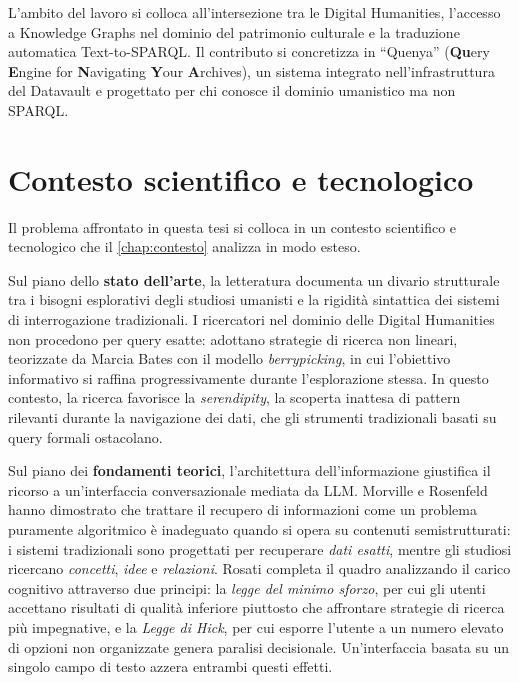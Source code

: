 L'ambito del lavoro si colloca all'intersezione tra le Digital Humanities, l'accesso a Knowledge Graphs nel dominio del patrimonio culturale e la traduzione automatica Text-to-SPARQL\@. Il contributo si concretizza in ``Quenya'' (\textbf{Qu}ery \textbf{E}ngine for \textbf{N}avigating \textbf{Y}our \textbf{A}rchives), un sistema integrato nell'infrastruttura del Datavault e progettato per chi conosce il dominio umanistico ma non SPARQL\@.

\section{Contesto scientifico e tecnologico}\label{sec:contesto_intro}

Il problema affrontato in questa tesi si colloca in un contesto scientifico e tecnologico che il \cref{chap:contesto} analizza in modo esteso.

Sul piano dello \textbf{stato dell'arte}, la letteratura documenta un divario strutturale tra i bisogni esplorativi degli studiosi umanisti e la rigidità sintattica dei sistemi di interrogazione tradizionali. I ricercatori nel dominio delle Digital Humanities non procedono per query esatte: adottano strategie di ricerca non lineari, teorizzate da Marcia Bates con il modello \textit{berrypicking}\cite{Bat89}, in cui l'obiettivo informativo si raffina progressivamente durante l'esplorazione stessa. In questo contesto, la ricerca favorisce la \textit{serendipity}, la scoperta inattesa di pattern rilevanti durante la navigazione dei dati, che gli strumenti tradizionali basati su query formali ostacolano.

Sul piano dei \textbf{fondamenti teorici}, l'architettura dell'informazione giustifica il ricorso a un'interfaccia conversazionale mediata da LLM\@. Morville e Rosenfeld\cite{Mor08} hanno dimostrato che trattare il recupero di informazioni come un problema puramente algoritmico è inadeguato quando si opera su contenuti semistrutturati: i sistemi tradizionali sono progettati per recuperare \textit{dati esatti}, mentre gli studiosi ricercano \textit{concetti}, \textit{idee} e \textit{relazioni}. Rosati\cite{Ros07} completa il quadro analizzando il carico cognitivo attraverso due principi: la \textit{legge del minimo sforzo}, per cui gli utenti accettano risultati di qualità inferiore piuttosto che affrontare strategie di ricerca più impegnative, e la \textit{Legge di Hick}, per cui esporre l'utente a un numero elevato di opzioni non organizzate genera paralisi decisionale. Un'interfaccia basata su un singolo campo di testo azzera entrambi questi effetti.

